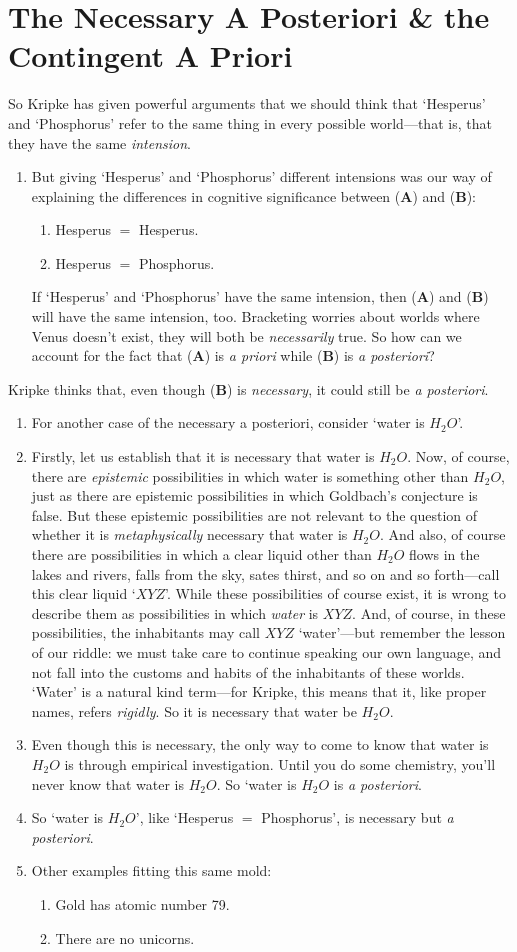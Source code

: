 \documentclass[landscape, two column, full page,reqno]{article}
\newcommand{\qe}{\begin{enumerate}[align=left,style=nextline,leftmargin=17pt,labelsep=5pt,font=\normalfont]}
\newcommand{\ze}{\end{enumerate}}
\newcommand{\p}{\item}
\newcommand{\e}{\emph}
\newcommand{\tbf}{\textbf}
\begin{document}
\section{The Necessary A Posteriori \& the Contingent A Priori}
\p So Kripke has given powerful arguments that we should think that `Hesperus' and `Phosphorus' refer to the same thing in every possible world---that is, that they have the same \e{intension}.
	\qe
	\p But giving `Hesperus' and `Phosphorus' different intensions was our way of explaining the differences in cognitive significance between (\tbf{A}) and (\tbf{B}):
		\qe
		\p[(\tbf{A})] Hesperus $=$ Hesperus.
		\p[(\tbf{B})] Hesperus $=$ Phosphorus.
		\ze 
	If `Hesperus' and `Phosphorus' have the same intension, then (\tbf{A}) and (\tbf{B}) will have the same intension, too.   Bracketing worries about worlds where Venus doesn't exist, they will both be \e{necessarily} true.  So how can we account for the fact that (\tbf{A}) is \e{a priori} while (\tbf{B}) is \e{a posteriori}?
	\ze 
\p Kripke thinks that, even though (\tbf{B}) is \e{necessary}, it could still be \e{a posteriori}.
	\qe
	\p For another case of the necessary a posteriori, consider `water is $H_2O$'.  
	\p Firstly, let us establish that it is necessary that water is $H_2O$.  Now, of course, there are \e{epistemic} possibilities in which water is something other than $H_2O$, just as there are epistemic possibilities in which Goldbach's conjecture is false.  But these epistemic possibilities are not relevant to the question of whether it is \e{metaphysically} necessary that water is $H_2O$.  And also, of course there are possibilities in which a clear liquid other than $H_2O$ flows in the lakes and rivers, falls from the sky, sates thirst, and so on and so forth---call this clear liquid `$XYZ$'.   While these possibilities of course exist, it is wrong to describe them as possibilities in which \e{water} is $XYZ$.   And, of course, in these possibilities, the inhabitants may call $XYZ$ `water'---but remember the lesson of our riddle: we must take care to continue speaking our own language, and not fall into the customs and habits of the inhabitants of these worlds.    `Water' is a natural kind term---for Kripke, this means that it, like proper names, refers \e{rigidly}.  So it is necessary that water be $H_2O$.  
	\p Even though this is necessary, the only way to come to know that water is $H_2O$ is through empirical investigation.  Until you do some chemistry, you'll never know that water is $H_2O$.  So `water is $H_2O$ is \e{a posteriori}.
	\p So `water is $H_2O$', like `Hesperus $=$ Phosphorus', is necessary but \e{a posteriori}.
	\p Other examples fitting this same mold:
		\qe
		\p Gold has atomic number 79.
		\p There are no unicorns.
		\ze 
	\ze 
\end{document}
